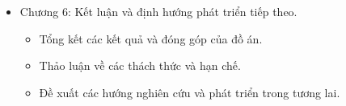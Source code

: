 \begin{itemize}
    \item Chương 6: Kết luận và định hướng phát triển tiếp theo.
          \begin{itemize}
              \item Tổng kết các kết quả và đóng góp của đồ án.
              \item Thảo luận về các thách thức và hạn chế.
              \item Đề xuất các hướng nghiên cứu và phát triển trong tương lai.
          \end{itemize}
\end{itemize}